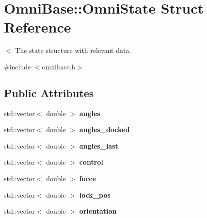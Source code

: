 \hypertarget{structOmniBase_1_1OmniState}{\section{Omni\-Base\-:\-:Omni\-State Struct Reference}
\label{structOmniBase_1_1OmniState}
}


$<$ The state structure with relevant data.  




{\ttfamily \#include $<$omnibase.\-h$>$}

\subsection*{Public Attributes}
\begin{DoxyCompactItemize}
\item 
\hypertarget{structOmniBase_1_1OmniState_a308df8149c1178f6614c6fa46b3a6f1e}{std\-::vector$<$ double $>$ {\bfseries angles}}\label{structOmniBase_1_1OmniState_a308df8149c1178f6614c6fa46b3a6f1e}

\item 
\hypertarget{structOmniBase_1_1OmniState_a8e21a0e1ec49c0200b0a643b6c925426}{std\-::vector$<$ double $>$ {\bfseries angles\-\_\-docked}}\label{structOmniBase_1_1OmniState_a8e21a0e1ec49c0200b0a643b6c925426}

\item 
\hypertarget{structOmniBase_1_1OmniState_a823efdd421f8ea426c6525200799b5e2}{std\-::vector$<$ double $>$ {\bfseries angles\-\_\-last}}\label{structOmniBase_1_1OmniState_a823efdd421f8ea426c6525200799b5e2}

\item 
\hypertarget{structOmniBase_1_1OmniState_a16f123e4a5da50cf94ec608a6f67c0d5}{std\-::vector$<$ double $>$ {\bfseries control}}\label{structOmniBase_1_1OmniState_a16f123e4a5da50cf94ec608a6f67c0d5}

\item 
\hypertarget{structOmniBase_1_1OmniState_a391320ee52a931aed7cb56e9b3bd5439}{std\-::vector$<$ double $>$ {\bfseries force}}\label{structOmniBase_1_1OmniState_a391320ee52a931aed7cb56e9b3bd5439}

\item 
\hypertarget{structOmniBase_1_1OmniState_a11ae38c471dd3e992677bfabb2168b1b}{std\-::vector$<$ double $>$ {\bfseries lock\-\_\-pos}}\label{structOmniBase_1_1OmniState_a11ae38c471dd3e992677bfabb2168b1b}

\item 
\hypertarget{structOmniBase_1_1OmniState_a83a16e0cd9d5c627733f710be60e0014}{std\-::vector$<$ double $>$ {\bfseries orientation}}\label{structOmniBase_1_1OmniState_a83a16e0cd9d5c627733f710be60e0014}


\end{DoxyCompactItemize}
